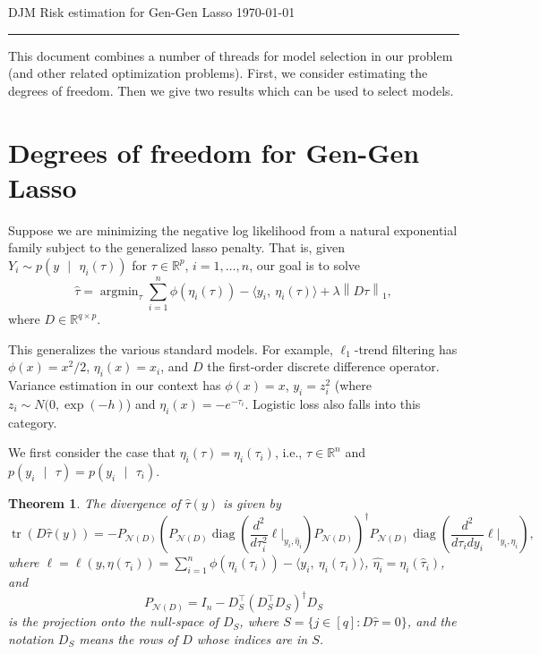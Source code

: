 \documentclass[11pt]{article}
\DeclareMathOperator*{\argmin}{argmin}
\newcommand{\norm}[1]{\left\lVert #1 \right\rVert}
\newcommand{\R}{\mathbb{R}}
\newcommand{\given}{\mbox{ }\vert\mbox{ }}
\renewcommand{\hat}{\widehat}
\DeclareMathOperator*{\trace}{tr}
\DeclareMathOperator*{\diag}{diag}
\newcommand{\Pnd}{P_{\mathcal{N}(D)}}
\newtheorem{theorem}{Theorem}[result]
\newcommand{\makeHeader}{\begin{center} 
DJM \hfill Risk estimation for Gen-Gen Lasso \hfill \today


\rule{\textwidth}{1pt}
\end{center}
}
\begin{document}
\makeHeader


This document combines a number of threads for model selection in our
problem (and other related optimization problems). First, we consider
estimating the degrees of freedom. Then we give two results which can
be used to select models.

\section{Degrees of freedom for Gen-Gen Lasso}
\label{sec:degrees-freedom-gen}

Suppose we are minimizing the negative log likelihood from a natural
exponential family subject to the generalized lasso penalty. That is,
given $Y_i \sim p(y \given \eta_i(\tau))$ for $\tau \in \R^p$, $i=1,\ldots,n$, our goal is to solve
\begin{equation}
  \label{eq:1}
  \hat\tau = \argmin_\tau \sum_{i=1}^n \phi(\eta_i(\tau)) - \langle y_i,\
  \eta_i(\tau)\rangle + \lambda\norm{D\tau}_1,
\end{equation}
where $D\in \R^{q\times p}$.

This generalizes the various standard models. For example,
$\ell_1$-trend filtering has $\phi(x) = x^2/2$, $\eta_i(x)=x_i$, and
$D$ the first-order discrete difference operator. Variance estimation
in our context has $\phi(x) = x$, $y_i = z^2_i$ (where $z_i\sim
N(0,\exp(-h)$) and $\eta_i(x) = -e^{-\tau_i}$. Logistic loss also
falls into this category.

We first consider the case that $\eta_i(\tau) = \eta_i(\tau_i)$, i.e.,
$\tau \in \R^n$ and $p(y_i \given \tau) = p(y_i \given \tau_i)$.

\begin{theorem}
  The divergence of $\hat\tau(y)$ is given by
  \begin{equation}
    \label{eq:2}
    \trace\left(D \hat\tau(y)\right) = -\Pnd \left(\Pnd
      \diag\left(\frac{d^2}{d\tau_i^2}\ell
        \vert_{y_i,\hat{\eta}_i}\right) \Pnd\right)^\dagger \Pnd
      \diag\left(\frac{d^2}{d\tau_i d y_i} \ell \vert_{y_i,\hat{\eta}_i}\right),
    \end{equation}
    where $\ell = \ell(y,\eta(\tau_i)) = \sum_{i=1}^n \phi(\eta_i(\tau_i)) - \langle y_i,\
    \eta_i(\tau_i)\rangle$, $\hat{\eta_i} = \eta_i(\hat\tau_i)$, and 
    \begin{equation}
      \label{eq:3}
      \Pnd = I_n - D_S^\top (D_S^\top D_S)^\dagger D_S
    \end{equation}
    is the projection onto the null-space of $D_S$, where $S = \{j \in
    [q] : D\hat\tau = 0\}$, and the notation $D_S$ means the rows of
    $D$ whose indices are in $S$.
\end{theorem}
\end{document}
